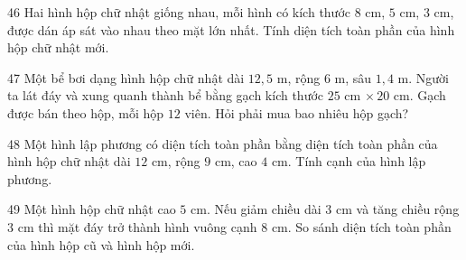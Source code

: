\gap
\begin{probbox}{46}{}
Hai hình hộp chữ nhật giống nhau, mỗi hình có kích thước $8$ cm, $5$ cm, $3$ cm, được dán áp sát vào nhau theo mặt lớn nhất. Tính diện tích toàn phần của hình hộp chữ nhật mới.
\end{probbox}
\gap
\begin{probbox}{47}{}
Một bể bơi dạng hình hộp chữ nhật dài $12{,}5$ m, rộng $6$ m, sâu $1{,}4$ m. Người ta lát đáy và xung quanh thành bể bằng gạch kích thước $25$ cm $\times\,20$ cm. Gạch được bán theo hộp, mỗi hộp $12$ viên. Hỏi phải mua bao nhiêu hộp gạch?
\end{probbox}
\gap
\begin{probbox}{48}{}
Một hình lập phương có diện tích toàn phần bằng diện tích toàn phần của hình hộp chữ nhật dài $12$ cm, rộng $9$ cm, cao $4$ cm. Tính cạnh của hình lập phương.
\end{probbox}
\gap
\begin{probbox}{49}{}
Một hình hộp chữ nhật cao $5$ cm. Nếu giảm chiều dài $3$ cm và tăng chiều rộng $3$ cm thì mặt đáy trở thành hình vuông cạnh $8$ cm. So sánh diện tích toàn phần của hình hộp cũ và hình hộp mới.
\end{probbox}
